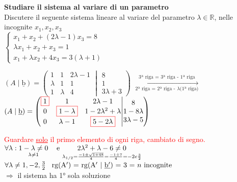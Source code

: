\textbf{Studiare il sistema al variare di un parametro} \\
\textsf{\small Discutere il seguente sistema lineare al variare del parametro $ \lambda \in \mathbb{R}$, nelle incognite $x_1, x_2, x_3$} \\

\(
\begin{cases*}
	x_1 + x_2 + (2\lambda - 1)x_3 = 8 \\
	\lambda x_1 + x_2 + x_3 = 1 \\
	x_1 + \lambda x_2 + 4x_3 = 3(\lambda + 1)
\end{cases*}
\)

\(
(A\mid\underline{\text{b}}) =
\left(
\begin{matrix}
	1 & 1  &  2\lambda-1\\
	\lambda &  1  &  1 \\
	1 &  \lambda  & 4
\end{matrix}
\middle\vert
\begin{matrix}
	8 \\ 1 \\ 3\lambda+3
\end{matrix}
\right)
\)
$\underset{\text{2ª riga = 2ª riga - $\lambda$(1ª riga)}}{\overset{\text{3ª riga = 3ª riga - 1ª riga}}{\longrightarrow}}$
\(
(A\mid\underline{\text{b}}) =
\left(
\begin{matrix}
	\color{red}\boxed{\normalcolor1} & 1  &  2\lambda-1\\
	0 &  \color{red}\boxed{\normalcolor1-\lambda}  &  1-2\lambda^2+\lambda \\
	0 &  \lambda-1  & \color{red}\boxed{\normalcolor5-2\lambda}
\end{matrix}
\middle\vert
\begin{matrix}
	8 \\ 1-8\lambda \\ 3\lambda-5
\end{matrix}
\right)
\)

\textsf{\small \textcolor{red}{Guardare \underline{solo} il primo elemento di ogni riga, cambiato di segno.}} \\

\(
\forall\lambda : \underset{\lambda \neq 1}{1 - \lambda \neq 0} \hspace{0.3cm}\text{ e } \underset{\lambda_{1/2} = \frac{-1\pm \sqrt{1 + 48}}{4} = \frac{-1\pm 7}{4} = -2 e \frac{3}{2}}{2\lambda^2 + \lambda - 6 \neq 0}
\) \\

\(
\forall \lambda \neq 1, -2, \frac{3}{2} \hspace{0.3cm} \text{rg(A$'$) = rg(A$'$ $\mid$ \underline{b$'$}) = 3 = $n$ incognite}
\) \\
$\Rightarrow$ \textsf{\small il sistema ha 1° sola soluzione} \\


